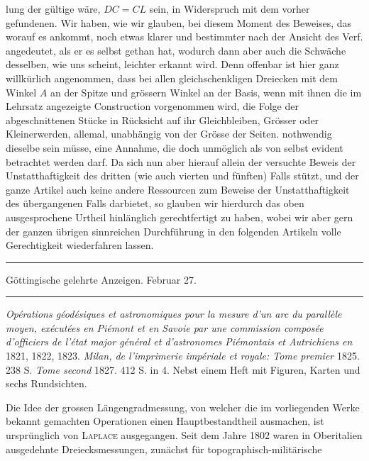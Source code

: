 %
lung der gültige wäre, \(DC=CL\) sein, in Widerspruch mit dem vorher gefundenen. Wir haben, wie wir glauben, bei diesem Moment des Beweises, das worauf es ankommt, noch etwas klarer und bestimmter nach der Ansicht des Verf. angedeutet, als er es selbst gethan hat, wodurch dann aber auch die Schwäche desselben, wie uns scheint, leichter erkannt wird. Denn offenbar ist hier ganz willkürlich angenommen, dass bei allen gleichschenkligen Dreiecken mit dem Winkel \(A\) an der Spitze und grössern Winkel an der Basis, wenn mit ihnen die im Lehrsatz angezeigte Construction vorgenommen wird, die Folge der abgeschnittenen Stücke in Rücksicht auf ihr Gleichbleiben, Grösser oder Kleinerwerden, allemal, unabhängig von der Grösse der Seiten. nothwendig dieselbe sein müsse, eine Annahme, die doch unmöglich als von selbst evident betrachtet werden darf. Da sich nun aber hierauf allein der versuchte Beweis der Unstatthaftigkeit des dritten (wie auch vierten und fünften) Falls stützt, und der ganze Artikel auch keine andere Ressourcen zum Beweise der Unstatthaftigkeit des übergangenen Falls darbietet, so glauben wir hierdurch das oben ausgesprochene Urtheil hinlänglich gerechtfertigt zu haben, wobei wir aber gern der ganzen übrigen sinnreichen Durchführung in den folgenden Artikeln volle Gerechtigkeit wiederfahren lassen.

\begin{center}
\rule{.85\textwidth}{.3pt}\par
Göttingische gelehrte Anzeigen. Februar 27.\par
\rule{.85\textwidth}{.3pt}
\end{center}
\hspace*{\parindent}\textit{Opérations géodésiques et astronomiques pour la mesure d’un arc du parallèle moyen, exécutées en Piémont et en Savoie par une commission composée d’officiers de l’état major général et d’astronomes Piémontais et Autrichiens en} 1821, 1822, 1823. \textit{Milan, de l’imprimerie impériale et royale: Tome premier} 1825. 238 S. \textit{Tome second} 1827. 412 S. in 4. Nebst einem Heft mit Figuren, Karten und sechs Rundsichten.

Die Idee der grossen Längengradmessung, von welcher die im vorliegenden Werke bekannt gemachten Operationen einen Hauptbestandtheil ausmachen, ist ursprünglich von \textsc{Laplace} ausgegangen. Seit dem Jahre 1802 waren in Oberitalien ausgedehnte Dreiecksmessungen, zunächst für topographisch-militärische
